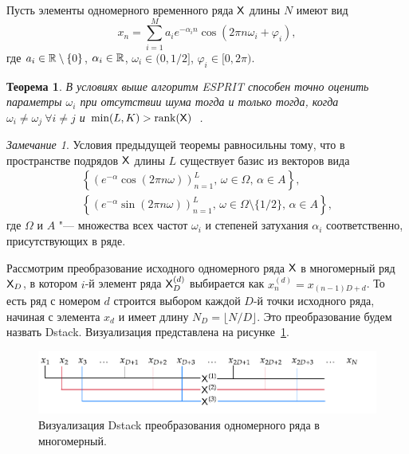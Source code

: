 \documentclass[12pt]{article}
\theoremstyle{plain}
\newtheorem{theorem}{Теорема}
\theoremstyle{definition}
\theoremstyle{remark}
\newtheorem{remark}{Замечание}
\begin{document}
Пусть элементы одномерного временного ряда $\mathsf{X}$ длины $N$ имеют вид
\begin{equation*}
  x_n = \sum_{i=1}^{M} a_i e^{-\alpha_i n} \cos(2 \pi n \omega_i + \varphi_i),
\end{equation*}
где $a_i \in \mathbb{R} \setminus \{0\}$, $\alpha_i \in \mathbb{R}$, $\omega_i
\in (0, 1/2]$, $\varphi_i \in [0, 2\pi)$.
\begin{theorem}
  В условиях выше алгоритм ESPRIT способен точно оценить параметры
  $\omega_i$ при отсутствии шума тогда и только тогда, когда
  $\omega_i \ne \omega_j\
  \forall i\ne j$ и $\min(L, K) > \operatorname{rank}(\mathsf{X})$~\cite{?}.
\end{theorem}
\begin{remark}
  Условия предыдущей теоремы равносильны тому, что в пространстве
  подрядов $\mathsf{X}$ длины $L$ существует базис из векторов вида
  \begin{gather*}
    \left\{\left(e^{-\alpha}\cos(2\pi n \omega)\right)_{n=1}^{L},\, \omega \in
    \Omega,\, \alpha \in A \right\}, \\
    \left\{\left(e^{-\alpha}\sin(2\pi n \omega)\right)_{n=1}^{L},\, \omega \in
    \Omega \setminus\{1/2\},\, \alpha \in A\right\},
  \end{gather*}
  где $\Omega$ и $A$ "--- множества всех частот $\omega_i$ и степеней
  затухания $\alpha_i$ соответственно, присутствующих в ряде.
\end{remark}

Рассмотрим преобразование исходного одномерного ряда $\mathsf{X}$ в многомерный ряд
$\mathsf{X}_D$, в котором $i$-й элемент ряда $\mathsf{X}_D^{(d)}$ выбирается как
$x_n^{(d)} = x_{(n-1)D + d}$.
То есть ряд с номером $d$ строится выбором каждой $D$-й точки исходного ряда,
начиная с элемента $x_d$ и имеет длину $N_D = \lfloor N / D \rfloor$.
Это преобразование будем назвать Dstack.
Визуализация представлена на рисунке~\ref{fig:dstack-diagram}.
\begin{figure}[!ht]
  \centering
  \includegraphics[width=\textwidth]{dstack_diagram.pdf}
  \caption{Визуализация Dstack преобразования одномерного ряда в многомерный.}
  \label{fig:dstack-diagram}
\end{figure}
\end{document}
